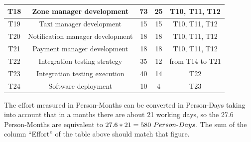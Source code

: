 \documentclass[a4paper,11pt]{report} %
\begin{document}
\begin{center}
{\begin{minipage}{\textwidth}
\begin{tabular}{| c | c | c | c | c |}
				\multicolumn{1}{|c|}{T18} & \multicolumn{1}{|c|}{Zone manager development} & \multicolumn{1}{|c|}{73} & \multicolumn{1}{|c|}{25} & \multicolumn{1}{|c|}{T10, T11, T12}\\\hline	
				
				\multicolumn{1}{|c|}{T19} & \multicolumn{1}{|c|}{Taxi manager development} & \multicolumn{1}{|c|}{15} & \multicolumn{1}{|c|}{15} & \multicolumn{1}{|c|}{T10, T11, T12}\\\hline	
				
				\multicolumn{1}{|c|}{T20} & \multicolumn{1}{|c|}{Notification manager development} & \multicolumn{1}{|c|}{18} & \multicolumn{1}{|c|}{18} & \multicolumn{1}{|c|}{T10, T11, T12}\\\hline	
				
				\multicolumn{1}{|c|}{T21} & \multicolumn{1}{|c|}{Payment manager development} & \multicolumn{1}{|c|}{18} & \multicolumn{1}{|c|}{18} & \multicolumn{1}{|c|}{T10, T11, T12}\\\hline	
				
				\multicolumn{1}{|c|}{T22} & \multicolumn{1}{|c|}{Integration testing strategy} & \multicolumn{1}{|c|}{35} & \multicolumn{1}{|c|}{12} & \multicolumn{1}{|c|}{from T14 to T21}\\\hline	
				
				\multicolumn{1}{|c|}{T23} & \multicolumn{1}{|c|}{Integration testing execution} & \multicolumn{1}{|c|}{40} & \multicolumn{1}{|c|}{14} & \multicolumn{1}{|c|}{T22}\\\hline	
				
				\multicolumn{1}{|c|}{T24} & \multicolumn{1}{|c|}{Software deployment} & \multicolumn{1}{|c|}{10} & \multicolumn{1}{|c|}{4} & \multicolumn{1}{|c|}{T23}\\\hline	
			\end{tabular}
		\end{minipage} }
		\end{center}
		The effort measured in Person-Months can be converted in Person-Days taking into account that in a months there are about 21 working days, so the 27.6 Person-Months are equivalent to \(27.6 * 21 = 580 \ Person$-$Days \). The sum of the column ``Effort'' of the table above should match that figure.
	
\end{document}
